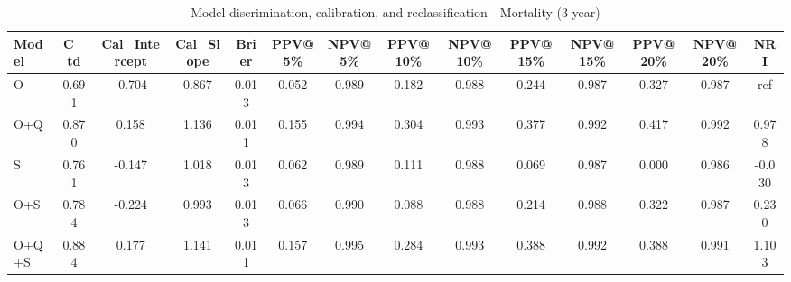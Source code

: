 \begin{table}[htbp]
\centering
\small
\caption{Model discrimination, calibration, and reclassification - Mortality (3-year)}
\label{tab:perf_mortality_3y}
\begin{tabular}{lccccccccccccc}
\toprule
Model & C\_td & Cal\_Intercept & Cal\_Slope & Brier & PPV@5\% & NPV@5\% & PPV@10\% & NPV@10\% & PPV@15\% & NPV@15\% & PPV@20\% & NPV@20\% & NRI \\
\midrule
O & 0.691 & -0.704 & 0.867 & 0.013 & 0.052 & 0.989 & 0.182 & 0.988 & 0.244 & 0.987 & 0.327 & 0.987 & ref \\
O+Q & 0.870 & 0.158 & 1.136 & 0.011 & 0.155 & 0.994 & 0.304 & 0.993 & 0.377 & 0.992 & 0.417 & 0.992 & 0.978 \\
S & 0.761 & -0.147 & 1.018 & 0.013 & 0.062 & 0.989 & 0.111 & 0.988 & 0.069 & 0.987 & 0.000 & 0.986 & -0.030 \\
O+S & 0.784 & -0.224 & 0.993 & 0.013 & 0.066 & 0.990 & 0.088 & 0.988 & 0.214 & 0.988 & 0.322 & 0.987 & 0.230 \\
O+Q+S & 0.884 & 0.177 & 1.141 & 0.011 & 0.157 & 0.995 & 0.284 & 0.993 & 0.388 & 0.992 & 0.388 & 0.991 & 1.103 \\
\bottomrule
\end{tabular}
\end{table}